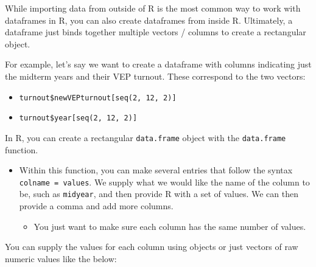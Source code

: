 \documentclass[
  letterpaper,
  DIV=11,
  numbers=noendperiod]{scrreprt}
\newenvironment{Shaded}{\begin{snugshade}}{\end{snugshade}}
\newcommand{\AttributeTok}[1]{\textcolor[rgb]{0.40,0.45,0.13}{#1}}
\newcommand{\DecValTok}[1]{\textcolor[rgb]{0.68,0.00,0.00}{#1}}
\newcommand{\FunctionTok}[1]{\textcolor[rgb]{0.28,0.35,0.67}{#1}}
\newcommand{\NormalTok}[1]{\textcolor[rgb]{0.00,0.23,0.31}{#1}}
\newcommand{\OtherTok}[1]{\textcolor[rgb]{0.00,0.23,0.31}{#1}}
\newcommand{\SpecialCharTok}[1]{\textcolor[rgb]{0.37,0.37,0.37}{#1}}
\providecommand{\tightlist}{%
  \setlength{\itemsep}{0pt}\setlength{\parskip}{0pt}}\usepackage{longtable,booktabs,array}
\begin{document}
While importing data from outside of R is the most common way to work
with dataframes in R, you can also create dataframes from inside R.
Ultimately, a dataframe just binds together multiple vectors / columns
to create a rectangular object.

For example, let's say we want to create a dataframe with columns
indicating just the midterm years and their VEP turnout. These
correspond to the two vectors:

\begin{itemize}
\tightlist
\item
  \texttt{turnout\$newVEPturnout{[}seq(2,\ 12,\ 2){]}}
\item
  \texttt{turnout\$year{[}seq(2,\ 12,\ 2){]}}
\end{itemize}

In R, you can create a rectangular \texttt{data.frame} object with the
\texttt{data.frame} function.

\begin{itemize}
\tightlist
\item
  Within this function, you can make several entries that follow the
  syntax \texttt{colname\ =\ values}. We supply what we would like the
  name of the column to be, such as \texttt{midyear}, and then provide R
  with a set of values. We can then provide a comma and add more
  columns.

  \begin{itemize}
  \tightlist
  \item
    You just want to make sure each column has the same number of
    values.
  \end{itemize}
\end{itemize}

\begin{Shaded}
\end{Shaded}

You can supply the values for each column using objects or just vectors
of raw numeric values like the below:
\end{document}
